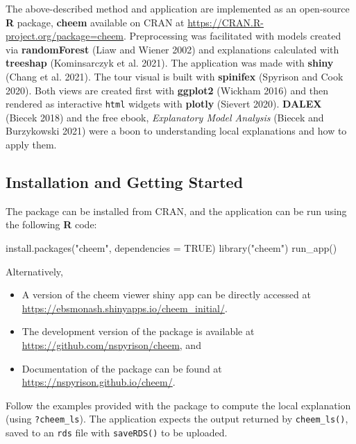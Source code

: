 \documentclass[11pt,twoside]{article}
\newenvironment{Shaded}{\begin{snugshade}}{\end{snugshade}}
\newcommand{\AttributeTok}[1]{\textcolor[rgb]{0.77,0.63,0.00}{#1}}
\newcommand{\ConstantTok}[1]{\textcolor[rgb]{0.00,0.00,0.00}{#1}}
\newcommand{\FunctionTok}[1]{\textcolor[rgb]{0.00,0.00,0.00}{#1}}
\newcommand{\NormalTok}[1]{#1}
\newcommand{\StringTok}[1]{\textcolor[rgb]{0.31,0.60,0.02}{#1}}
\providecommand{\tightlist}{%
  \setlength{\itemsep}{0pt}\setlength{\parskip}{0pt}}
\begin{document}
The above-described method and application are implemented as an open-source \textbf{R} package, \textbf{cheem} available on CRAN at \url{https://CRAN.R-project.org/package=cheem}. Preprocessing was facilitated with models created via \textbf{randomForest} (Liaw and Wiener 2002) and explanations calculated with \textbf{treeshap} (Kominsarczyk et al. 2021). The application was made with \textbf{shiny} (Chang et al. 2021). The tour visual is built with \textbf{spinifex} (Spyrison and Cook 2020). Both views are created first with \textbf{ggplot2} (Wickham 2016) and then rendered as interactive \texttt{html} widgets with \textbf{plotly} (Sievert 2020). \textbf{DALEX} (Biecek 2018) and the free ebook, \emph{Explanatory Model Analysis} (Biecek and Burzykowski 2021) were a boon to understanding local explanations and how to apply them.

\hypertarget{installation-and-getting-started}{%
\subsection{Installation and Getting Started}\label{installation-and-getting-started}}

The package can be installed from CRAN, and the application can be run using the following \textbf{R} code:

\begin{Shaded}
\begin{Highlighting}[]
\FunctionTok{install.packages}\NormalTok{(}\StringTok{"cheem"}\NormalTok{, }\AttributeTok{dependencies =} \ConstantTok{TRUE}\NormalTok{)}
\FunctionTok{library}\NormalTok{(}\StringTok{"cheem"}\NormalTok{)}
\FunctionTok{run\_app}\NormalTok{()}
\end{Highlighting}
\end{Shaded}

Alternatively,

\begin{itemize}
\tightlist
\item
  A version of the cheem viewer shiny app can be directly accessed at
  \url{https://ebsmonash.shinyapps.io/cheem_initial/}.
\item
  The development version of the package is available at \url{https://github.com/nspyrison/cheem}, and
\item
  Documentation of the package can be found at \url{https://nspyrison.github.io/cheem/}.
\end{itemize}

Follow the examples provided with the package to compute the local explanation (using \texttt{?cheem\_ls}). The application expects the output returned by \texttt{cheem\_ls()}, saved to an \texttt{rds} file with \texttt{saveRDS()} to be uploaded.
\end{document}
